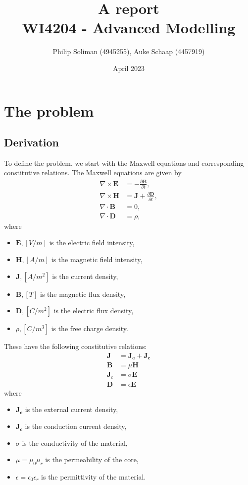 \documentclass[11pt]{report}
\title{%
    A report \\
    \large WI4204 - Advanced Modelling
}
\author{Philip Soliman (4945255), Auke Schaap (4457919)}
\date{April 2023}
\begin{document}
\maketitle



\chapter{The problem}

\section{Derivation}

To define the problem, we start with the Maxwell equations and corresponding constitutive relations. The Maxwell equations are given by
\begin{align*}
    \nabla \times \mathbf{E} &= -\frac{\partial \mathbf{B}}{\partial t}, \\
    \nabla \times \mathbf{H} &=  \mathbf{J} + \frac{\partial \mathbf{D}}{\partial t}, \\
    \nabla \cdot \mathbf{B} &= 0, \\
    \nabla \cdot \mathbf{D} &= \rho,
\end{align*}
where
\begin{itemize}
    \item $\mathbf{E}, [V/m]$ is the electric field intensity,
    \item $\mathbf{H}, [A/m]$ is the magnetic field intensity,
    \item $\mathbf{J}, [A/m^2]$ is the current density,
    \item $\mathbf{B}, [T]$ is the magnetic flux density,
    \item $\mathbf{D}, [C/m^2]$ is the electric flux density,
    \item $\rho, [C/m^3]$ is the free charge density.
\end{itemize}

These have the following constitutive relations:
\begin{align*}
    \mathbf{J} &= \mathbf{J_e} + \mathbf{J_c} \\
    \mathbf{B} &= \mu\mathbf{H} \\
    \mathbf{J}_c &= \sigma\mathbf E \\
    \mathbf{D} &= \epsilon \mathbf E
\end{align*}
where
\begin{itemize}
    \item $\mathbf{J_e}$ is the external current density,
    \item $\mathbf{J_c}$ is the conduction current density,
    \item $\sigma$ is the conductivity of the material,
    \item $\mu = \mu_0\mu_r$ is the permeability of the core,
    \item $\epsilon = \epsilon_0\epsilon_r$ is the permittivity of the material.
\end{itemize}
\end{document}

